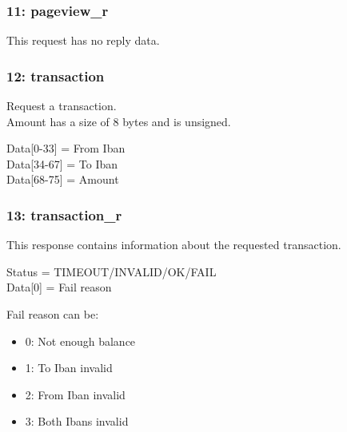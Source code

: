 \documentclass[12pt]{article}
\begin{document}
\subsubsection{11: pageview\_r}
This request has no reply data.

\subsubsection{12: transaction}
Request a transaction.\\
Amount has a size of 8 bytes and is unsigned.

Data[0-33] = From Iban\\
Data[34-67] = To Iban\\
Data[68-75] = Amount

\subsubsection{13: transaction\_r}
This response contains information about the requested transaction.

Status = TIMEOUT/INVALID/OK/FAIL\\
Data[0] = Fail reason

Fail reason can be:
\begin{itemize}
	\item 0: Not enough balance
	\item 1: To Iban invalid
	\item 2: From Iban invalid
	\item 3: Both Ibans invalid
\end{itemize}
\end{document}
